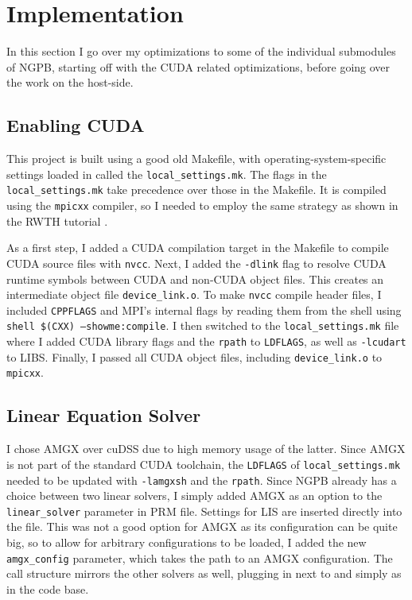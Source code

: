 \chapter{Implementation}
\label{sec:implementation}

In this section I go over my optimizations to some of the individual submodules of NGPB, starting off with the CUDA related optimizations, before going over the work on the host-side.

\section{Enabling CUDA}
\label{sec:implementation-enabling-cuda}

This project is built using a good old Makefile, with operating-system-specific settings loaded in called the \texttt{local\_settings.mk}.
The flags in the \texttt{local\_settings.mk} take precedence over those in the Makefile.
It is compiled using the \texttt{mpicxx} compiler, so I needed to employ the same strategy as shown in the RWTH tutorial \cite{rwth_cuda}.

As a first step, I added a CUDA compilation target in the Makefile to compile CUDA source files with \texttt{nvcc}.
Next, I added the \texttt{-dlink} flag to resolve CUDA runtime symbols between CUDA and non-CUDA object files.
This creates an intermediate object file \texttt{device\_link.o}.
To make \texttt{nvcc} compile header files, I included \texttt{CPPFLAGS} and MPI's internal flags by reading them from the shell using \texttt{shell \$(CXX) --showme:compile}.
I then switched to the \texttt{local\_settings.mk} file where I added CUDA library flags and the \texttt{rpath} to \texttt{LDFLAGS}, as well as \texttt{-lcudart} to LIBS.
Finally, I passed all CUDA object files, including \texttt{device\_link.o} to \texttt{mpicxx}.

\section{Linear Equation Solver}
\label{sec:implementation-lin-eq-solver}

I chose AMGX over cuDSS due to high memory usage of the latter.
Since AMGX is not part of the standard CUDA toolchain, the \texttt{LDFLAGS} of \texttt{local\_settings.mk} needed to be updated with \texttt{-lamgxsh} and the \texttt{rpath}.
Since NGPB already has a choice between two linear solvers, I simply added AMGX as an option to the \texttt{linear\_solver} parameter in PRM file.
Settings for LIS are inserted directly into the file.
This was not a good option for AMGX as its configuration can be quite big, so to allow for arbitrary configurations to be loaded, I added the new \texttt{amgx\_config} parameter, which takes the path to an AMGX configuration.
The call structure mirrors the other solvers as well, plugging in next to  and  simply as  in the code base.

